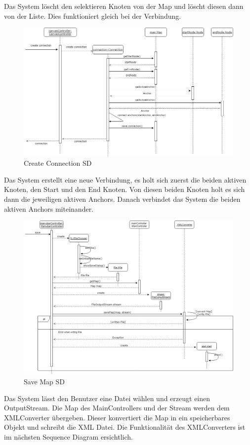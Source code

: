 Das System löscht den selektieren Knoten von der Map und löscht diesen dann von der Liste. 
Dies funktioniert gleich bei der Verbindung.

\begin{figure}[H]
	\centering
		\includegraphics[width=\textwidth]{images/connectionSD.PNG}
	\caption{Create Connection SD}
	\label{fig:create_connection_SD}
\end{figure}
Das System erstellt eine neue Verbindung, es holt sich zuerst die beiden aktiven Knoten, den Start 
und den End Knoten. Von diesen beiden Knoten holt es sich dann die jeweiligen aktiven Anchors. Danach
verbindet das System die beiden aktiven Anchors miteinander.

\begin{figure}[H]
	\centering
		\includegraphics[width=\textwidth]{images/savemapSD.png}
	\caption{Save Map SD}
	\label{fig:savemap_SD}
\end{figure}
Das System lässt den Benutzer eine Datei wählen und erzeugt einen OutputStream. Die Map des MainControllers und der Stream werden dem XMLConverter übergeben. Dieser konvertiert die Map in ein speicherbares Objekt und schreibt die XML Datei. Die Funktionalität des XMLConverters ist im nächsten Sequence Diagram ersichtlich.

